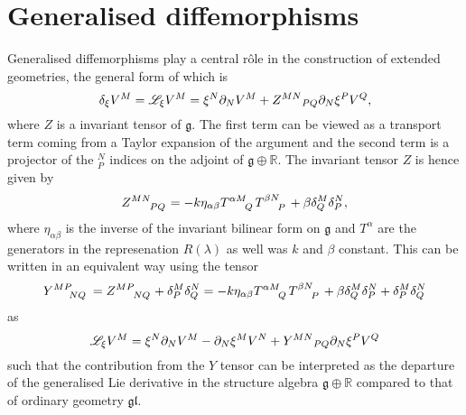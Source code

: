 \section{Generalised diffemorphisms}
Generalised diffemorphisms play a central rôle in the construction of extended geometries, the general form of which is
\begin{equation}
    \delta_\xi V^M = \mathscr{L}_\xi V^M = \xi^N\pd_N V^M+\tensor{Z}{^M^N}_{PQ}\pd_N\xi^PV^Q,
\end{equation}
where $Z$ is a invariant tensor of $\mathfrak{g}$. The first term can be viewed as a transport term coming from a Taylor expansion of the argument and the second term is a projector of the $^N_P$ indices on the adjoint of $\mathfrak{g}\oplus \mathbb{R}$. The invariant tensor $Z$ is hence given by 
\begin{equation}
    \tensor{Z}{^M^N_P_Q} = -k\eta_{\alpha\beta}\tensor{T}{^\alpha^M_Q}\tensor{T}{^\beta^N_P}+\beta\delta^M_Q\delta^N_P,
\end{equation}
where $\eta_{\alpha\beta}$ is the inverse of the invariant bilinear form on $\mathfrak{g}$ and $T^{\alpha}$ are the generators in the represenation $R(\lambda)$ as well was $k$ and $\beta$ constant. This can be written in an equivalent way using the tensor
\begin{equation}\label{eq:Y}
    \tensor{Y}{^M^P_N_Q} = \tensor{Z}{^M^P_N_Q}+\delta^M_P\delta^N_Q = -k\eta_{\alpha\beta}\tensor{T}{^\alpha^M_Q}\tensor{T}{^\beta^N_P}+\beta\delta^M_Q\delta^N_P+\delta^M_P\delta^N_Q
\end{equation}
as 
\begin{equation}
    \mathscr{L}_\xi V^M = \xi^N\pd_N V^M-\pd_N\xi^MV^N+\tensor{Y}{^M^N}_{PQ}\pd_N\xi^PV^Q
\end{equation}
such that the contribution from the $Y$ tensor can be interpreted as the departure of the generalised Lie derivative in the structure algebra $\mathfrak{g}\oplus\mathbb{R}$ compared to that of ordinary geometry $\mathfrak{gl}$. 

